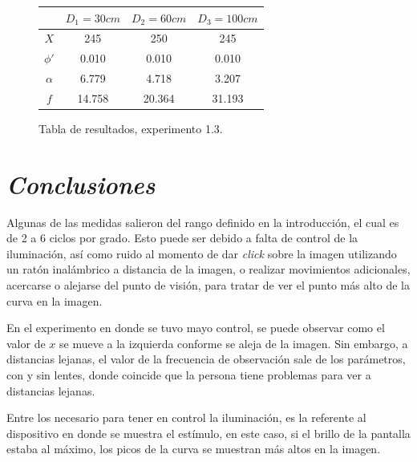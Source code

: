 \documentclass[conference]{IEEEtran}
\begin{document}
\begin{figure}[htbp]
\centering

\begin{tabular}{c|c|c|c|}
	 & $D_1=30cm$ & $D_2=60cm$ & $D_3=100 cm$\\
	\hline
	$X$ & 245 & 250 & 245\\
	\hline
	$\phi'$ & 0.010 & 0.010 & 0.010\\
	\hline
	$\alpha$ & 6.779 & 4.718 & 3.207\\
	\hline
	$f$ & 14.758 & 20.364 & 31.193\\
	\hline
\end{tabular}

\caption{Tabla de resultados, experimento 1.3.}
\label{res1.3}
\end{figure}



\section{\textit{Conclusiones}}

Algunas de las medidas salieron del rango definido en la introducción, el cual es de 2 a 6 ciclos por grado. Esto puede ser debido a falta de control de la iluminación, así como ruido al momento de dar \textit{click} sobre la imagen utilizando un ratón inalámbrico a distancia de la imagen, o realizar movimientos adicionales, acercarse o alejarse del punto de visión, para tratar de ver el punto más alto de la curva en la imagen.

En el experimento en donde se tuvo mayo control, se puede observar como el valor de $x$ se mueve a la izquierda conforme se aleja de la imagen. Sin embargo, a distancias lejanas, el valor de la frecuencia de observación sale de los parámetros, con y sin lentes, donde coincide que la persona tiene problemas para ver a distancias lejanas.

Entre los necesario para tener en control la iluminación, es la referente al dispositivo en donde se muestra el estímulo, en este caso, si el brillo de la pantalla estaba al máximo, los picos de la curva se muestran más altos en la imagen.

\end{document}
